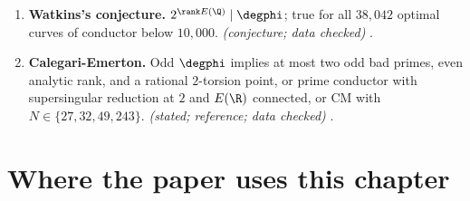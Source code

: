\begin{enumerate}[label=\textbf{\thechapter.\arabic*}]
; sources, error term and example  in .
\item \textbf{Watkins's conjecture.} $2^{\rank E(\Q)}\mid\degphi$; true for all $38{,}042$ optimal curves of conductor below $10{,}000$. \emph{(conjecture; data checked)} .
\item \textbf{Calegari-Emerton.} Odd $\degphi$ implies at most two odd bad primes, even analytic rank, and a rational $2$-torsion point, or prime conductor with supersingular reduction at $2$ and $E(\R)$
connected, or CM with $N\in\{27,32,49,243\}$. \emph{(stated; reference; data checked)} .
\end{enumerate}

\section*{Where the paper uses this chapter}

